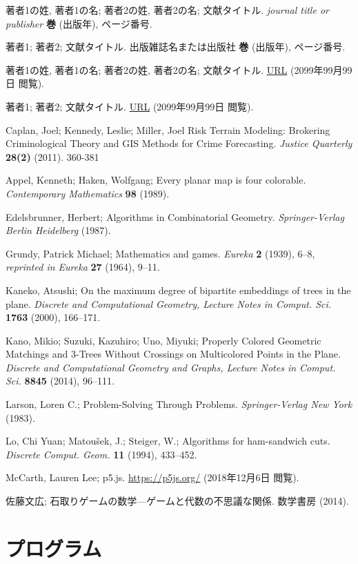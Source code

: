 \documentclass[12pt,a4paper,oneside]{jsbook}
\theoremstyle{plain}
\begin{document}
\renewcommand{\bibname}{参考文献}
\begin{thebibliography}{99}

著者1の姓, 著者1の名;
著者2の姓, 著者2の名;
{文献タイトル}.
{\em journal title or publisher}
{\bfseries 巻}
(出版年),
ページ番号.

著者1;
著者2;
{文献タイトル}.
{出版雑誌名または出版社} %
{\bfseries 巻}
(出版年),
ページ番号.

著者1の姓, 著者1の名;
著者2の姓, 著者2の名;
{文献タイトル}.
\url{URL}
(2099年99月99日 閲覧).

著者1;
著者2;
{文献タイトル}.
\url{URL}
(2099年99月99日 閲覧).

Caplan, Joel;
Kennedy, Leslie;
Miller, Joel
{Risk Terrain Modeling: Brokering Criminological Theory 
and GIS Methods for Crime Forecasting}.
{\em Justice Quarterly}
{\bfseries 28(2)}
(2011).
360-381

Appel, Kenneth;
Haken, Wolfgang;
{Every planar map is four colorable}.
{\em Contemporary Mathematics}
{\bfseries 98}
(1989).

Edelsbrunner, Herbert;
{Algorithms in Combinatorial Geometry}.
{\em Springer-Verlag Berlin Heidelberg}
(1987).

Grundy, Patrick Michael;
{Mathematics and games}.
{\em Eureka}
{\bfseries 2}
(1939),
6--8,
{\em reprinted in Eureka}
{\bfseries 27}
(1964),
9--11.

Kaneko, Atsushi;
{On the maximum degree of bipartite embeddings
of trees in the plane}.
{\em
Discrete and Computational Geometry,
Lecture Notes in Comput. Sci.}
{\bfseries 1763}
(2000),
166--171.

Kano, Mikio;
Suzuki, Kazuhiro;
Uno, Miyuki;
{Properly Colored Geometric Matchings and
3-Trees Without Crossings on Multicolored Points
in the Plane}.
{\em
Discrete and Computational Geometry and Graphs,
Lecture Notes in Comput. Sci.}
{\bfseries 8845}
(2014),
96--111.

Larson, Loren C.;
{Problem-Solving Through Problems}.
{\em Springer-Verlag New York}
(1983).

Lo, Chi Yuan;
Matou{\v{s}}ek, J.;
Steiger, W.;
{Algorithms for ham-sandwich cuts}.
{\em Discrete Comput. Geom.}
{\bfseries 11}
(1994),
433--452.

McCarth, Lauren Lee;
{p5.js}.
\url{https://p5js.org/}
(2018年12月6日 閲覧).

佐藤文広;
{石取りゲームの数学---ゲームと代数の不思議な関係}.
{数学書房}
(2014).

\end{thebibliography}


\appendix
\chapter{プログラム}
\label{program}


\end{document}
